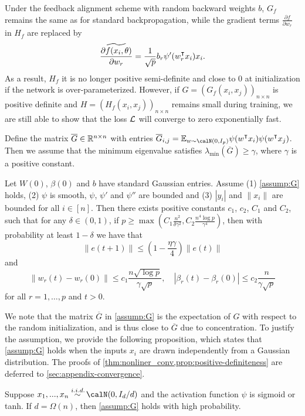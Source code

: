 Under the feedback alignment scheme with random backward weights $b$, $G_f$ remains the same as for standard backpropagation, while the gradient terms $\frac{\partial f}{\partial w_r}$ in $H_f$
are replaced by
\begin{align}\label{eqn:alignment-update-f}
  \widetilde{\frac{\partial f(x_i, \theta)}{\partial w_r}}   = \frac{1}{\sqrt{p}} b_r \psi'(w_r\transpose x_i)x_i.
\end{align}
As a result, $H_f$ it is no longer positive semi-definite and close to $0$ at initialization if the network is over-parameterized. However, if $G = (G_f(x_i,x_j))_{n\times n}$ is positive definite and $H = (H_f(x_i,x_j))_{n\times n}$ remains small during training, we are still able to show that the loss $\mathcal{L}$ will converge to zero exponentially fast.

\begin{assumption}\label{assump:G}
Define the matrix $\overline{G} \in \mathbb{R}^{n\times n}$ with entries
$\overline{G}_{i,j} = \E_{w\sim \calN(0,I_p)}\psi(w\transpose x_i) \psi(w\transpose  x_j)$.
Then we assume that the minimum eigenvalue satisfies $\lambda_{\min}(\overline{G}) \geq \gamma$, where $\gamma$ is a positive constant.
\end{assumption}
\vskip5pt

\begin{theorem}\label{thm:nonliner_conv}
Let $W(0)$, $\beta(0)$ and $b$ have \iid standard Gaussian entries. Assume \textnormal{(1)} \cref{assump:G} holds, \textnormal{(2)} $\psi$ is smooth, $\psi$, $\psi'$ and $\psi''$ are bounded and \textnormal{(3)} $|y_i|$ and $\|x_i\|$ are bounded for all $i\in[n]$. Then there exists positive constants $c_1$, $c_2$, $C_1$ and $C_2$, such that for any $\delta\in(0,1)$, if $p \geq \max\left(C_1\frac{n^2}{\delta\gamma^2}, C_2\frac{n^4\log p}{\gamma^4}\right)$, then with probability at least $1-\delta$ we have that
\begin{equation}\label{eq:conv}
    \|e(t+1)\| \leq (1-\frac{\eta\gamma}{4})\|e(t)\|
\end{equation}
and
\begin{equation}
\label{eq:weights}
    \|w_r(t)-w_r(0)\| \leq c_1\frac{n\sqrt{\log p}}{\gamma\sqrt p}, \quad |\beta_r(t)-\beta_r(0)| \leq c_2\frac{n}{\gamma\sqrt p}
\end{equation}
for all $r=1,\ldots, p$ and $t>0$.
\end{theorem}

We note that the matrix $\overline{G}$ in \cref{assump:G} is the expectation of $G$ with respect to the random initialization, and is thus close to $\overline{G}$ due to concentration. To justify the assumption, we provide the following proposition, which states that \cref{assump:G} holds when the inputs $x_i$ are drawn independently from a Gaussian distribution. The proofs of \cref{thm:nonliner_conv,prop:positive-definiteness} are deferred to \cref{sec:appendix-convergence}.

\begin{proposition}\label{prop:positive-definiteness}
Suppose $x_1,...,x_n \overset{\iid}{\sim} \calN(0,I_d/d)$ and the activation function $\psi$ is sigmoid or tanh. If $d=\Omega(n)$, then \cref{assump:G} holds with high probability.
\end{proposition}
